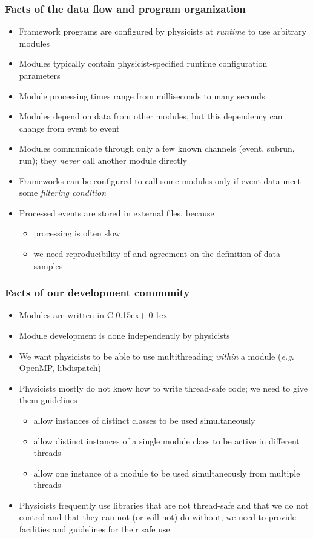 \documentclass{beamer}
\newcommand{\cpp}{C\kern-0.15ex{+}\kern-0.1ex{+}\xspace}
\begin{document}
\begin{frame}
  \frametitle{Facts of the data flow and program organization}
  \begin{itemize}
    \item Framework programs are configured by physicists
          at \emph{runtime} to use
          arbitrary modules
    \item Modules typically contain physicist-specified
          runtime configuration parameters
    \item Module processing times range from milliseconds to many seconds
    \item Modules depend on data from other modules, but this dependency
          can change from event to event
    \item Modules communicate through only a few known channels (event,
          subrun, run); they \emph{never} call another module directly
    \item Frameworks can be configured to call some modules only if event
          data meet some \emph{filtering condition}
    \item Processed events are stored in external files, because
    \begin{itemize}
      \item processing is often slow
      \item we need reproducibility of and agreement on the definition of
            data samples
    \end{itemize}
  \end{itemize}
\end{frame}

\begin{frame}
  \frametitle{Facts of our development community}
  \begin{itemize}
    \item Modules are written in \cpp
    \item Module development is done independently by physicists
    \item We want physicists to be able to use multithreading \emph{within}
          a module (\textit{e.g.} OpenMP, libdispatch)
    \item Physicists mostly do not know how to write thread-safe code;
          we need to give them guidelines
    \begin{itemize}
      \item allow instances of distinct classes to be used simultaneously
      \item allow distinct instances of a single module class to be active
            in different threads
      \item allow one instance of a module to be used simultaneously from
            multiple threads
    \end{itemize}
    \item Physicists frequently use libraries that are not thread-safe and that
          we do not control and that they can not (or will not) do without; we need
          to provide facilities and guidelines for their safe use
  \end{itemize}
\end{frame}
\end{document}
